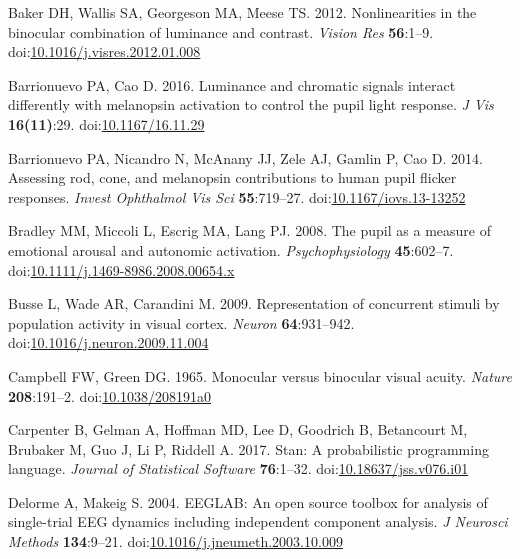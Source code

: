 \documentclass[
]{article}
\newlength{\cslhangindent}
\newlength{\cslentryspacingunit} %
\newenvironment{CSLReferences}[2] %
 {%
  \setlength{\parindent}{0pt}
  \ifodd #1
  \let\oldpar\par
  \def\par{\hangindent=\cslhangindent\oldpar}
  \fi
  \setlength{\parskip}{#2\cslentryspacingunit}
 }%
 {}
\begin{document}
\begin{CSLReferences}{1}{0}
\leavevmode{}%
Baker DH, Wallis SA, Georgeson MA, Meese TS. 2012. Nonlinearities in the binocular combination of luminance and contrast. \emph{Vision Res} \textbf{56}:1--9. doi:\href{https://doi.org/10.1016/j.visres.2012.01.008}{10.1016/j.visres.2012.01.008}

\leavevmode{}%
Barrionuevo PA, Cao D. 2016. Luminance and chromatic signals interact differently with melanopsin activation to control the pupil light response. \emph{J Vis} \textbf{16(11)}:29. doi:\href{https://doi.org/10.1167/16.11.29}{10.1167/16.11.29}

\leavevmode{}%
Barrionuevo PA, Nicandro N, McAnany JJ, Zele AJ, Gamlin P, Cao D. 2014. Assessing rod, cone, and melanopsin contributions to human pupil flicker responses. \emph{Invest Ophthalmol Vis Sci} \textbf{55}:719--27. doi:\href{https://doi.org/10.1167/iovs.13-13252}{10.1167/iovs.13-13252}

\leavevmode{}%
Bradley MM, Miccoli L, Escrig MA, Lang PJ. 2008. The pupil as a measure of emotional arousal and autonomic activation. \emph{Psychophysiology} \textbf{45}:602--7. doi:\href{https://doi.org/10.1111/j.1469-8986.2008.00654.x}{10.1111/j.1469-8986.2008.00654.x}

\leavevmode{}%
Busse L, Wade AR, Carandini M. 2009. Representation of concurrent stimuli by population activity in visual cortex. \emph{Neuron} \textbf{64}:931--942. doi:\href{https://doi.org/10.1016/j.neuron.2009.11.004}{10.1016/j.neuron.2009.11.004}

\leavevmode{}%
Campbell FW, Green DG. 1965. Monocular versus binocular visual acuity. \emph{Nature} \textbf{208}:191--2. doi:\href{https://doi.org/10.1038/208191a0}{10.1038/208191a0}

\leavevmode{}%
Carpenter B, Gelman A, Hoffman MD, Lee D, Goodrich B, Betancourt M, Brubaker M, Guo J, Li P, Riddell A. 2017. Stan: A probabilistic programming language. \emph{Journal of Statistical Software} \textbf{76}:1--32. doi:\href{https://doi.org/10.18637/jss.v076.i01}{10.18637/jss.v076.i01}

\leavevmode{}%
Delorme A, Makeig S. 2004. {EEGLAB}: An open source toolbox for analysis of single-trial {EEG} dynamics including independent component analysis. \emph{J Neurosci Methods} \textbf{134}:9--21. doi:\href{https://doi.org/10.1016/j.jneumeth.2003.10.009}{10.1016/j.jneumeth.2003.10.009}


\end{CSLReferences}
\end{document}
